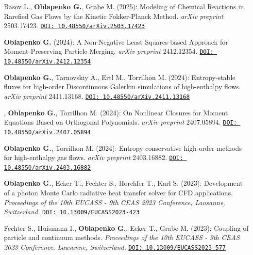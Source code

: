 \begin{enumerate}
    \preprintitem Basov L., \textbf{Oblapenko G.}, Grabe M. (2025): Modeling of Chemical Reactions in Rarefied Gas Flows by the Kinetic Fokker-Planck Method. \textit{arXiv preprint} 2503.17423.
    \newline
    \href{https://doi.org/10.48550/arXiv.2503.17423}{\texttt{DOI: 10.48550/arXiv.2503.17423}}

    \preprintitem \textbf{Oblapenko G.} (2024): A Non-Negative Least Squares-based Approach for Moment-Preserving Particle Merging. \textit{arXiv preprint} 2412.12354.
    \newline
    \href{https://doi.org/10.48550/arXiv.2412.12354}{\texttt{DOI: 10.48550/arXiv.2412.12354}}
    
    \preprintitem \textbf{Oblapenko G.}, {Tarnovskiy A.}, {Ertl M.}, {Torrilhon M.} (2024): Entropy-stable fluxes for high-order Discontinuous Galerkin simulations of high-enthalpy flows. \textit{arXiv preprint} 2411.13168.
    \newline
    \href{https://doi.org/10.48550/arXiv.2411.13168}{\texttt{DOI: 10.48550/arXiv.2411.13168}}
  
  , \textbf{Oblapenko G.}, {Torrilhon M.} (2024): On Nonlinear Closures for Moment Equations Based on Orthogonal Polynomials. \textit{arXiv preprint} 2407.05894.
  \newline
    \href{https://doi.org/10.48550/arXiv.2407.05894}{\texttt{DOI: 10.48550/arXiv.2407.05894}}
  
  \preprintitem \textbf{Oblapenko G.}, {Torrilhon M.} (2024): Entropy-conservative high-order methods for high-enthalpy gas flows. \textit{arXiv preprint} 2403.16882.
  \newline
    \href{https://doi.org/10.48550/arXiv.2403.16882}{\texttt{DOI: 10.48550/arXiv.2403.16882}}

  \confitem \textbf{Oblapenko G.}, Ecker T., Fechter S., Horchler T., Karl S. (2023): Development of a photon Monte Carlo radiative heat transfer solver for CFD applications. \textit{Proceedings of the 10th EUCASS - 9th CEAS 2023 Conference, Lausanne, Switzerland.}
  \newline
  \href{https://doi.org/10.13009/EUCASS2023-423}{\texttt{DOI:  10.13009/EUCASS2023-423}}
  
  \confitem Fechter S., Huismann I., \textbf{Oblapenko G.}, Ecker T., Grabe M. (2023): Coupling of particle and continuum methods. \textit{Proceedings of the 10th EUCASS - 9th CEAS 2023 Conference, Lausanne, Switzerland. }
  \newline
  \href{https://doi.org/10.13009/EUCASS2023-577}{\texttt{DOI: 10.13009/EUCASS2023-577}}
  

\end{enumerate}
